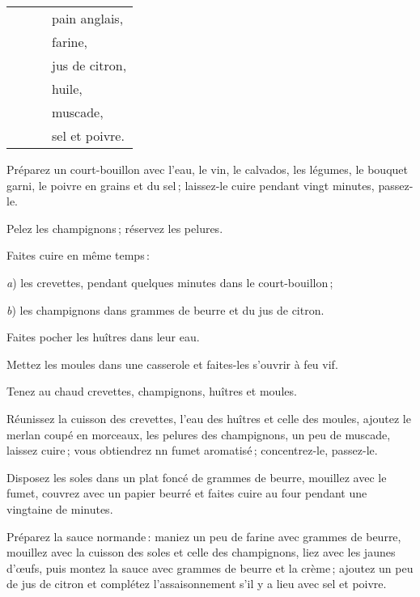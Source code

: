 \begin{longtable}{rrrp{16em}}
        &         &    & pain anglais,                                                                    \\
        &         &    & farine,                                                                          \\
        &         &    & jus de citron,                                                                   \\
        &         &    & huile,                                                                           \\
        &         &    & muscade,                                                                         \\
        &         &    & sel et poivre.                                                                   \\
\end{longtable}
\normalsize

Préparez un court-bouillon avec l'eau, le vin, le calvados, les légumes, le
bouquet garni, le poivre en grains et du sel ; laissez-le cuire pendant vingt
minutes, passez-le.

Pelez les champignons ; réservez les pelures.

Faites cuire en même temps :

\textit{a}) les crevettes, pendant quelques minutes dans le court-bouillon ;

\textit{b}) les champignons dans {\mmm} grammes de beurre et du jus de citron.

Faites pocher les huîtres dans leur eau.

Mettez les moules dans une casserole et faites-les s'ouvrir à feu vif.

Tenez au chaud crevettes, champignons, huîtres et moules.

Réunissez la cuisson des crevettes, l'eau des huîtres et celle des moules,
ajoutez le merlan coupé en morceaux, les pelures des champignons, un peu de
muscade, laissez cuire ; vous obtiendrez nn fumet aromatisé ; concentrez-le,
passez-le.

Disposez les soles dans un plat foncé de {\mmm} grammes de beurre, mouillez avec
le fumet, couvrez avec un papier beurré et faites cuire au four pendant une
vingtaine de minutes.

Préparez la sauce normande : maniez un peu de farine avec {\mmm} grammes de beurre,
mouillez avec la cuisson des soles et celle des champignons, liez avec les
jaunes d'œufs, puis montez la sauce avec {\mmm} grammes de beurre et la crème ;
ajoutez un peu de jus de citron et complétez l'assaisonnement s'il y a lieu
avec sel et poivre.

